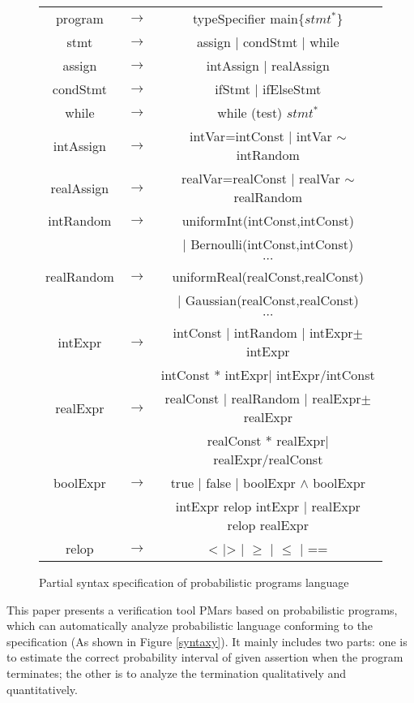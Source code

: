 \begin{figure}[h]
	\centering
	\begin{tabular}{ccc}
		\hline
		program & $\rightarrow$ & typeSpecifier main\{$stmt^*$\} \\
		stmt & $\rightarrow$ & assign | condStmt | while \\
		assign & $\rightarrow$ & intAssign | realAssign \\
		condStmt & $\rightarrow$ & ifStmt | ifElseStmt\\
		while & $\rightarrow$ & while (test) $stmt^*$\\
		intAssign & $\rightarrow$ &  intVar=intConst | intVar $\sim$ intRandom\\
		realAssign & $\rightarrow$ & realVar=realConst | realVar $\sim$ realRandom\\
		intRandom & $\rightarrow$ & uniformInt(intConst,intConst)\\
		&  & | Bernoulli(intConst,intConst)\\
		&  & $\cdots$ \\
		realRandom & $\rightarrow$ & uniformReal(realConst,realConst)\\
		&  & | Gaussian(realConst,realConst)\\
		&  & $\cdots$ \\
		intExpr & $\rightarrow$ & intConst | intRandom | intExpr$\pm$intExpr\\
		& & intConst * intExpr| intExpr/intConst\\
		realExpr & $\rightarrow$ & realConst | realRandom | realExpr$\pm$realExpr\\
		& & realConst * realExpr| realExpr/realConst\\
		boolExpr& $\rightarrow$ & true | false | boolExpr $\wedge$ boolExpr \\
		& & intExpr relop intExpr | realExpr relop realExpr\\
		relop & $\rightarrow$ & <  |> | $\geq$ | $\leq$ | ==\\
		\hline
	\end{tabular}
	\label{syntax}
	\caption{Partial syntax specification of probabilistic programs language}
\end{figure}

This paper presents a verification tool PMars based on probabilistic programs, which can automatically analyze probabilistic language conforming to the specification (As shown in Figure \ref{syntaxy}). It mainly includes two parts: one is to estimate the correct probability interval of given assertion when the program terminates; the other is to analyze the termination qualitatively and quantitatively.


